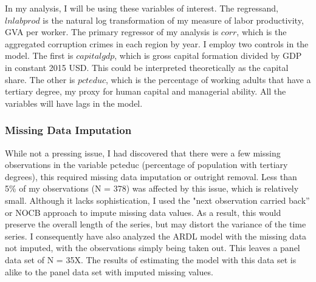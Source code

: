 \documentclass[12pt]{article} %
\begin{document}
\begin{table}[!htbp] \centering \renewcommand*{\arraystretch}{1.1}\caption{Summary Statistics}
\end{table}

In my analysis, I will be using these variables of interest. The regressand, $lnlabprod$ is the natural log transformation of my measure of labor productivity, GVA per worker. The primary regressor of my analysis is $corr$, which is the aggregated corruption crimes in each region by year. I employ two controls in the model. The first is $capitalgdp$, which is gross capital formation divided by GDP in constant 2015 USD. This could be interpreted theoretically as the capital share. The other is $pcteduc$, which is the percentage of working adults that have a tertiary degree, my proxy for human capital and managerial ability. All the variables will have lags in the model. 

\subsubsection*{Missing Data Imputation}

While not a pressing issue, I had discovered that there were a few missing observations in the variable pcteduc (percentage of population with tertiary degrees), this required missing data imputation or outright removal. Less than 5\% of my observations (N = 378) was affected by this issue, which is relatively small. Although it lacks sophistication, I used the "next observation carried back” or NOCB approach to impute missing data values. As a result, this would preserve the overall length of the series, but may distort the variance of the time series. I consequently have also analyzed the ARDL model with the missing data not imputed, with the observations simply being taken out. This leaves a panel data set of N = 35X. The results of estimating the model with this data set is alike to the panel data set with imputed missing values. 
\end{document}
